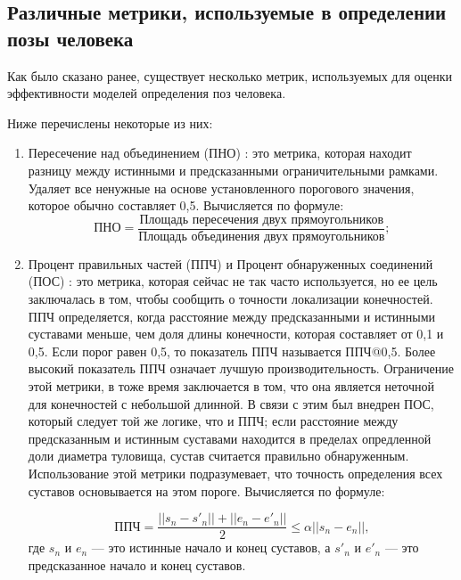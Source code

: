 \subsection{Различные метрики, используемые в определении позы человека}

Как было сказано ранее, существует несколько метрик, используемых для оценки эффективности моделей определения поз человека.

Ниже перечислены некоторые из них:

\begin{enumerate}[label=\arabic*)]
	
	\item Пересечение над объединением (ПНО) \cite{IoU}: это метрика, которая находит разницу между истинными и предсказанными ограничительными рамками.
	Удаляет все ненужные на основе установленного порогового значения, которое обычно составляет 0,5.
	Вычисляется по формуле:
	\begin{equation}
		\text{ПНО} = \frac{\text{Площадь пересечения двух прямоугольников}}{\text{Площадь объединения двух прямоугольников}};
	\end{equation}
	
	\item Процент правильных частей (ППЧ) и Процент обнаруженных соединений (ПОС) \cite{PDJ}: это метрика, которая сейчас не так часто используется, но ее цель заключалась в том, чтобы сообщить о точности локализации конечностей.
	ППЧ определяется, когда расстояние между предсказанными и истинными суставами меньше, чем доля длины конечности, которая составляет от 0,1 и 0,5.
	Если порог равен 0,5, то показатель ППЧ называется ППЧ@0,5.
	Более высокий показатель ППЧ означает лучшую производительность.
	Ограничение этой метрики, в тоже время заключается в том, что она является неточной для конечностей с небольшой длинной.
	В связи с этим был внедрен ПОС, который следует той же логике, что и ППЧ; если расстояние между предсказанным и истинным суставами находится в пределах опредленной доли диаметра туловища, сустав считается правильно обнаруженным.
	Использование этой метрики подразумевает, что точность определения всех суставов основывается на этом пороге.
	Вычисляется по формуле:
	
	\begin{equation}
		\text{ППЧ} =  \frac{||s_n - s'_n|| + ||e_n - e'_n||}{2} \leq \alpha ||s_n - e_n||,
	\end{equation}
	где $s_n$ и $e_n$ --- это истинные начало и конец суставов, а $s'_n$ и $e'_n$ --- это предсказанное начало и конец суставов.
		

\end{enumerate}
